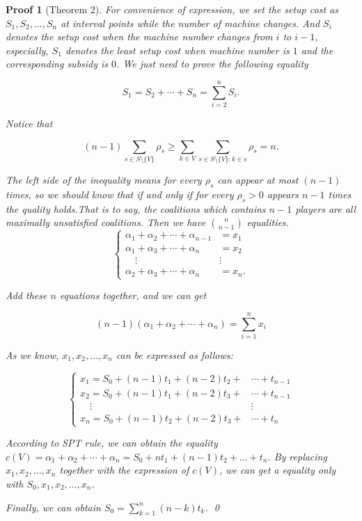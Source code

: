 \documentclass[UTF8]{article}
\newtheorem{pf}{\hspace{2em}Proof}
\begin{document}
\begin{pf}[Theorem 2]

For convenience of expression, we set the setup cost as $S_{1},S_{2}, \dots ,S_{n}$ at interval points while the number of machine changes.
And $S_{i}$ denotes the setup cost when the machine number changes from $i$ to $i-1$, especially, $S_{1}$ denotes the least setup cost when machine number is $1$ and the corresponding subsidy is $0$.
We just need to prove the following equality

\begin{displaymath}
  S_{1}=S_{2}+\cdots+S_{n}=\sum_{i=2}^n S_i.
\end{displaymath}

Notice that

\begin{displaymath}
  (n-1) \sum_{s \in S \setminus\{V\} } \rho_s \geq
  \sum_{k\in V}\sum_{s \in S \setminus\{V\}:k \in s} \rho_s = n.
\end{displaymath}

The left side of the inequality means for every $\rho_s$ can appear at most $(n-1)$ times, so we should know that if and only if for every $\rho_s > 0$ appears $n-1$ times the quality holds.That is to say, the coalitions which contains $n-1$ players are all maximally unsatisfied coalitions. Then we have $n \choose n-1$ equalities.
\[
\begin{cases}
 \alpha_1+\alpha_2+ \cdots+\alpha_{n-1} & = x_1 \\
 \alpha_1+\alpha_3+ \cdots+\alpha_n & = x_2 \\
 \quad   \vdots        &\vdots\\
 \alpha_2+\alpha_3+ \cdots+\alpha_n & = x_n.
\end{cases}
\]

Add these $n$ equations together, and we can get

\begin{equation*}
  (n-1)(\alpha_1+\alpha_2+ \cdots+\alpha_n)=\sum_{i=1}^{n}x_i
\end{equation*}

As we know, $x_1,x_2,\dots,x_n$ can be expressed as follows:

\[
\begin{cases}
x_1 = S_0 + (n-1)t_1 + (n-2)t_2 + &\cdots + t_{n-1} \\
x_2 = S_0 + (n-1)t_1 + (n-2)t_3 + &\cdots + t_{n-1} \\
\quad   \vdots        &\vdots\\
x_n = S_0 + (n-1)t_2 + (n-2)t_3 + &\cdots + t_{n}
\end{cases}
\]

According to SPT rule, we can obtain the equality
$c(V)=\alpha_1+\alpha_2+\cdots+\alpha_n=S_0+nt_1+(n-1)t_2+\dots+t_n$.
By replacing $x_1,x_2,\dots,x_n$ together with the expression of $c(V)$, we can get a equality only with $S_0,x_1,x_2,\dots,x_n$.

Finally, we can obtain $S_0 = \sum_{k=1}^n (n-k)t_k$.
\qed
\end{pf}
\end{document}
